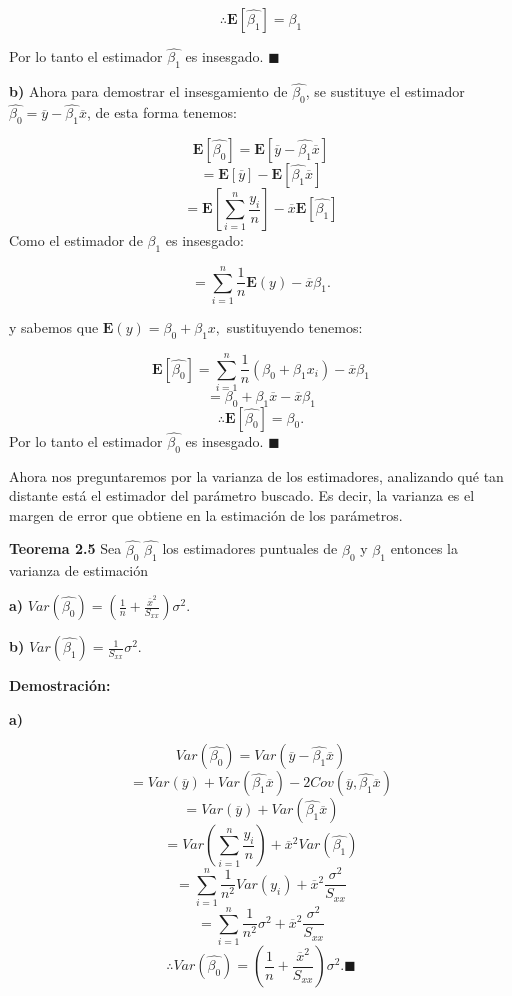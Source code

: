 \documentclass[
  a4paper,
  oneside,
  openany]{book}
\begin{document}
\[\therefore \mathbf{E}\left[\hat{\beta_{1}}\right]=\beta_{1}\]

Por lo tanto el estimador \(\hat{\beta_{1}}\) es insesgado. \(\blacksquare\)

\textbf{b)} Ahora para demostrar el insesgamiento de \(\hat{\beta_{0}}\), se sustituye el estimador \(\hat{\beta_{0}}=\overline{y}-\hat{\beta_{1}}\overline{x}\), de esta forma tenemos:

\[\mathbf{E}\left[\hat{\beta_{0}}\right]=\mathbf{E}\left[\overline{y}-\hat{\beta_{1}}\overline{x}\right]\]
\[=\mathbf{E}\left[\overline{y}\right]-\mathbf{E}\left[\hat{\beta_{1}}\overline{x}\right]\]
\[=\mathbf{E}\left[\sum_{i=1}^{n}\frac{y_{i}}{n}\right]-\overline{x}\mathbf{E}\left[\hat{\beta_{1}}\right]\]
Como el estimador de \(\beta_{1}\) es insesgado:

\[=\sum_{i=1}^{n}\frac{1}{n}\mathbf{E}\left(y\right)-\overline{x}\beta_{1}.\]

y sabemos que \(\mathbf{E}(y)=\beta_{0}+\beta_{1}x,\) sustituyendo tenemos:

\[\mathbf{E}\left[\hat{\beta_{0}}\right]=\sum_{i=1}^{n}\frac{1}{n}(\beta_{0}+\beta_{1}x_{i})-\overline{x}\beta_{1}\]
\[=\beta_{0}+\beta_{1}\overline{x}-\overline{x}\beta_{1}\]
\[\therefore \mathbf{E}[\hat{\beta_{0}}]=\beta_{0}.\]
Por lo tanto el estimador \(\hat{\beta_{0}}\) es insesgado. \(\blacksquare\)

Ahora nos preguntaremos por la varianza de los estimadores, analizando qué tan distante está el estimador del parámetro buscado. Es decir, la varianza es el margen de error que obtiene en la estimación de los parámetros.

\textbf{Teorema 2.5} Sea \(\hat{\beta_{0}}\) \(\hat{\beta_{1}}\) los estimadores puntuales de \(\beta_{0}\) y \(\beta_{1}\) entonces la varianza de estimación

\textbf{a)} \(Var\left(\hat{\beta_{0}}\right)=\left(\frac{1}{n}+\frac{\overline{x}^2}{S_{xx}}\right) \sigma^2.\)

\textbf{b)} \(Var\left(\hat{\beta_{1}}\right)= \frac{1}{S_{xx}} \sigma^2.\)

\textbf{Demostración:}

\textbf{a)}

\[Var\left(\hat{\beta_{0}}\right)=Var\left(\overline{y}-\hat{\beta_{1}}\overline{x}\right)\]
\[=Var(\overline{y})+Var(\hat{\beta_{1}}\overline{x})-2Cov(\overline{y},\hat{\beta_{1}}\overline{x})\]
\[=Var(\overline{y})+Var(\hat{\beta_{1}}\overline{x})\]
\[=Var\left(\sum_{i=1}^{n}\frac{y_{i}}{n} \right)+\overline{x}^2Var(\hat{\beta_{1}})\]
\[=\sum_{i=1}^{n}\frac{1}{n^2}Var(y_{i})+\overline{x}^2\frac{\sigma^2}{S_{xx}}\]
\[=\sum_{i=1}^{n}\frac{1}{n^2}\sigma^2+\overline{x}^2\frac{\sigma^2}{S_{xx}}\]
\[\therefore Var\left(\hat{\beta_{0}}\right)=\left(\frac{1}{n}+\frac{\overline{x}^2}{S_{xx}}\right) \sigma^2. \blacksquare\]
\end{document}
